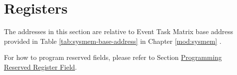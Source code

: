 \documentclass[main\_\_EN.tex]{subfiles}
\begin{document}





\newpage
\section{Registers}

The addresses in this section are relative to Event Task Matrix base address provided in Table \ref{tab:sysmem-base-address} in Chapter \ref{mod:sysmem} \textit{}.

For how to program reserved fields, please refer to Section \hyperref[programming-reserved-field]{Programming Reserved Register Field}.


\end{document}
